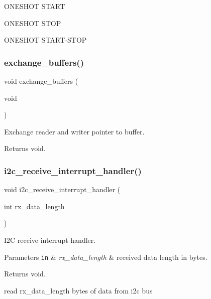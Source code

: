 O\+N\+E\+S\+H\+OT S\+T\+A\+RT

O\+N\+E\+S\+H\+OT S\+T\+OP

O\+N\+E\+S\+H\+OT S\+T\+A\+R\+T-\/\+S\+T\+OP \mbox{\label{i2c-rain_8h_aafa3d59a1bde3085849eee08f110612f}} 
\subsubsection{\texorpdfstring{exchange\+\_\+buffers()}{exchange\_buffers()}}
{\footnotesize\ttfamily void exchange\+\_\+buffers (\begin{DoxyParamCaption}\item[{void}]{ }\end{DoxyParamCaption})}



Exchange reader and writer pointer to buffer. 

\begin{DoxyReturn}{Returns}
void. 
\end{DoxyReturn}
\mbox{\label{i2c-rain_8h_a6e27532df66f6bf186654355def5c9af}} 
\subsubsection{\texorpdfstring{i2c\+\_\+receive\+\_\+interrupt\+\_\+handler()}{i2c\_receive\_interrupt\_handler()}}
{\footnotesize\ttfamily void i2c\+\_\+receive\+\_\+interrupt\+\_\+handler (\begin{DoxyParamCaption}\item[{int}]{rx\+\_\+data\+\_\+length }\end{DoxyParamCaption})}



I2C receive interrupt handler. 


\begin{DoxyParams}[1]{Parameters}
\mbox{\tt in}  & {\em rx\+\_\+data\+\_\+length} & received data length in bytes. \\
\hline
\end{DoxyParams}
\begin{DoxyReturn}{Returns}
void. 
\end{DoxyReturn}
read rx\+\_\+data\+\_\+length bytes of data from i2c bus

